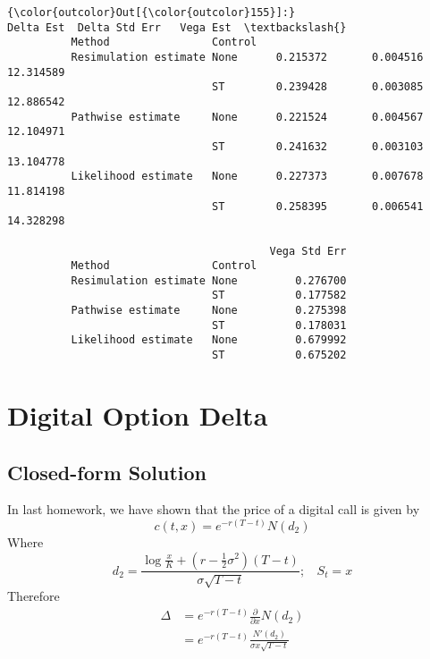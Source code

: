 \documentclass[11pt]{article}
\begin{document}
            \begin{Verbatim}[commandchars=\\\{\}]
{\color{outcolor}Out[{\color{outcolor}155}]:}                                Delta Est  Delta Std Err   Vega Est  \textbackslash{}
          Method                Control                                        
          Resimulation estimate None      0.215372       0.004516  12.314589   
                                ST        0.239428       0.003085  12.886542   
          Pathwise estimate     None      0.221524       0.004567  12.104971   
                                ST        0.241632       0.003103  13.104778   
          Likelihood estimate   None      0.227373       0.007678  11.814198   
                                ST        0.258395       0.006541  14.328298   
          
                                         Vega Std Err  
          Method                Control                
          Resimulation estimate None         0.276700  
                                ST           0.177582  
          Pathwise estimate     None         0.275398  
                                ST           0.178031  
          Likelihood estimate   None         0.679992  
                                ST           0.675202  
\end{Verbatim}
        
    \section{Digital Option Delta}\label{digital-option-delta}

\subsection{Closed-form Solution}\label{closed-form-solution}

In last homework, we have shown that the price of a digital call is
given by \[
c(t,x) = e^{-r(T-t)}N(d_2)
\] Where \[
d_2 = \frac{\log\frac{x}{K}+(r-\frac{1}{2}\sigma^2)(T-t)}{\sigma\sqrt{T-t}};~~~~S_t=x
\] Therefore \[
\begin{split}
\Delta &= e^{-r(T-t)}\frac{\partial}{\partial x}N(d_2)\\
&=e^{-r(T-t)}\frac{N'(d_2)}{\sigma x \sqrt{T-t}} \\
\end{split}
\]
\end{document}
